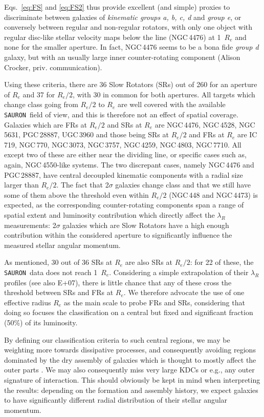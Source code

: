 \documentclass[useAMS,usenatbib,usegraphicx]{mn2e}
\newcommand{\Sauron}{\texttt{SAURON}}
\begin{document}
Eqs.~\ref{eq:FS} and \ref{eq:FS2} thus provide excellent (and simple) proxies to discriminate 
between galaxies of {\em kinematic groups a, b, c, d} 
and {\em group e}, or conversely between regular and non-regular rotators,
with only one object with regular disc-like stellar velocity maps below the line 
(NGC\,4476) at 1~$R_e$ and none for the smaller aperture. In fact, NGC\,4476
seems to be a bona fide {\em group d} galaxy, but with an usually large inner
counter-rotating component (Alison Crocker, priv. communication).

Using these criteria, there are 36 Slow Rotators (SRs) out of 260 for an 
aperture of $R_e$ and 37 for $R_e/2$,
with 30 in common for both apertures. All targets which change class going
from $R_e/2$ to $R_e$ are well covered with the available \Sauron\ field of
view, and this is therefore not an effect of spatial coverage. Galaxies which are FRs at
$R_e/2$ and SRs at $R_e$ are NGC\,4476, NGC\,4528, NGC\,5631, PGC\,28887, UGC\,3960 and
those being SRs at $R_e/2$ and FRs at $R_e$ are IC\,719, NGC\,770, NGC\,3073, NGC\,3757, NGC\,4259, 
NGC\,4803, NGC\,7710. All except two of these are either near the dividing line,
or specific cases such as, again, NGC\,4550-like systems. 
The two discrepant cases, namely NGC\,4476 and PGC\,28887, have central decoupled
kinematic components with a radial size larger than $R_e/2$.
The fact that 2$\sigma$ galaxies change class and that we still have some of
them above the threshold even within $R_e/2$ (NGC\,448 and NGC\,4473)
is expected, as the corresponding counter-rotating components span a range of 
spatial extent and luminosity contribution which directly affect the ${\lambda_R}$ 
measurements: 2$\sigma$ galaxies which are Slow Rotators have a high enough contribution within 
the considered aperture to significantly influence the measured stellar angular momentum.

As mentioned, 30 out of 36 SRs at $R_e$ are also SRs at $R_e/2$: for 22 of
these, the \Sauron\ data does not reach 1~$R_e$. Considering a
simple extrapolation of their $\lambda_R$ profiles (see also E+07), there is little chance that
any of these cross the threshold between SRs and FRs at $R_e$. 
We therefore advocate the use of one effective radius $R_e$ as the main scale to probe FRs and SRs, 
considering that doing so focuses the classification on a central but fixed and significant fraction (50\%) 
of its luminosity. 

By defining our classification criteria to such central regions,
we may be weighting more towards dissipative processes, and
consequently avoiding regions dominated by the dry assembly of galaxies \citep{Khochfar+03} 
which is thought to mostly affect the outer parts 
\citep{Naab+07, Naab+09, Hopkins+09b, Hoffman+10, Bois10, Oser+10}. We may also consequently miss very large KDCs
\citep{Coccato+09} or e.g., any outer signature of interaction.
This should obviously be kept in mind when interpreting the results: depending
on the formation and assembly history, we expect galaxies to have significantly
different radial distribution of their stellar angular momentum. 
\end{document}
